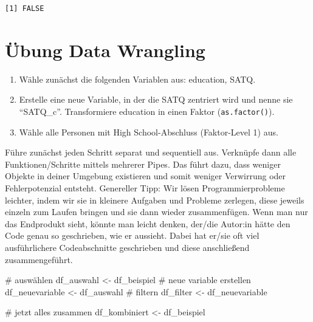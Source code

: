 \documentclass[
  letterpaper,
  DIV=11,
  numbers=noendperiod]{scrreprt}
\newenvironment{Shaded}{\begin{snugshade}}{\end{snugshade}}
\newcommand{\CommentTok}[1]{\textcolor[rgb]{0.37,0.37,0.37}{#1}}
\newcommand{\NormalTok}[1]{\textcolor[rgb]{0.00,0.23,0.31}{#1}}
\newcommand{\OtherTok}[1]{\textcolor[rgb]{0.00,0.23,0.31}{#1}}
\providecommand{\tightlist}{%
  \setlength{\itemsep}{0pt}\setlength{\parskip}{0pt}}\usepackage{longtable,booktabs,array}
\begin{document}
\begin{verbatim}
[1] FALSE
\end{verbatim}


\chapter{Übung Data Wrangling}\label{uxfcbung-data-wrangling}

\begin{enumerate}
\def\labelenumi{\arabic{enumi})}
\tightlist
\item
  Wähle zunächst die folgenden Variablen aus: education, SATQ.
\item
  Erstelle eine neue Variable, in der die SATQ zentriert wird und nenne
  sie ``SATQ\_c''. Transformiere education in einen Faktor
  (\texttt{as.factor()}).
\item
  Wähle alle Personen mit High School-Abschluss (Faktor-Level 1) aus.
\end{enumerate}

Führe zunächst jeden Schritt separat und sequentiell aus. Verknüpfe dann
alle Funktionen/Schritte mittels mehrerer Pipes. Das führt dazu, dass
weniger Objekte in deiner Umgebung existieren und somit weniger
Verwirrung oder Fehlerpotenzial entsteht. Genereller Tipp: Wir lösen
Programmierprobleme leichter, indem wir sie in kleinere Aufgaben und
Probleme zerlegen, diese jeweils einzeln zum Laufen bringen und sie dann
wieder zusammenfügen. Wenn man nur das Endprodukt sieht, könnte man
leicht denken, der/die Autor:in hätte den Code genau so geschrieben, wie
er aussieht. Dabei hat er/sie oft viel ausführlichere Codeabschnitte
geschrieben und diese anschließend zusammengeführt.

\begin{Shaded}
\begin{Highlighting}[]
\CommentTok{\# auswählen}
\NormalTok{ df\_auswahl }\OtherTok{\textless{}{-}}\NormalTok{ df\_beispiel}
\CommentTok{\# neue variable erstellen}
\NormalTok{df\_neuevariable }\OtherTok{\textless{}{-}}\NormalTok{ df\_auswahl}
\CommentTok{\# filtern}
\NormalTok{df\_filter }\OtherTok{\textless{}{-}}\NormalTok{ df\_neuevariable }

\CommentTok{\# jetzt alles zusammen}
\NormalTok{df\_kombiniert }\OtherTok{\textless{}{-}}\NormalTok{ df\_beispiel }
\end{Highlighting}
\end{Shaded}

\end{document}
